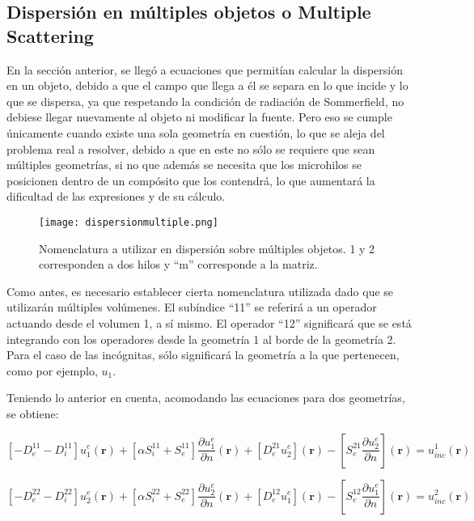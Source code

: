 \documentclass[12pt,letterpaper]{article}
\numberwithin{equation}{section}
\begin{document}
\subsection{Dispersión en múltiples objetos o Multiple Scattering}


En la sección anterior, se llegó a ecuaciones que permitían calcular la dispersión en un objeto, debido a que el campo que llega a él se separa en lo que incide y lo que se dispersa, ya que respetando la condición de radiación de Sommerfield, no debiese llegar nuevamente al objeto ni modificar la fuente. Pero eso se cumple únicamente cuando existe una sola geometría en cuestión, lo que se aleja del problema real a resolver, debido a que en este no sólo se requiere que sean múltiples geometrías, si no que además se necesita que los microhilos se posicionen dentro de un compósito que los contendrá, lo que aumentará la dificultad de las expresiones y de su cálculo.

\begin{figure}[H]
	\centering\texttt{[image: dispersionmultiple.png]}
	\caption{Nomenclatura a utilizar en dispersión sobre múltiples objetos. 1 y 2 corresponden a dos hilos y ``m'' corresponde a la matriz.}
	\label{fig: dispersionmultiple}
\end{figure} 

Como antes, es necesario establecer cierta nomenclatura utilizada dado que se utilizarán múltiples volúmenes. El subíndice ``11'' se referirá a un operador actuando desde el volumen 1, a sí mismo. El operador ``12'' significará que se está integrando con los operadores desde la geometría 1 al borde de la geometría 2. Para el caso de las incógnitas, sólo significará la geometría a la que pertenecen, como por ejemplo, $u_{1}$. 

Teniendo lo anterior en cuenta, acomodando las ecuaciones para dos geometrías, se obtiene:

\begin{equation}
\left[-D_{e}^{11} - D_{i}^{11}\right] u^{e}_1(\textbf{r}) + \left[\alpha S_{i}^{11} + S_{e}^{11}\right]\frac{\partial u^{e}_1}{\partial n}(\textbf{r}) + \left[D_{e}^{21} u^{e}_2\right](\textbf{r}) - \left[S_{e}^{21} \frac{\partial u^{e}_2}{\partial n}\right](\textbf{r}) = u_{inc}^1(\textbf{r}) 
\label{eq: multi_trans_1}		
\end{equation}

\begin{equation}
\left[-D_{e}^{22} - D_{i}^{22}\right] u^{e}_2(\textbf{r}) + \left[\alpha S_{i}^{22} + S_{e}^{22}\right]\frac{\partial u^{e}_2}{\partial n}(\textbf{r}) + \left[D_{e}^{12} u^{e}_1\right](\textbf{r}) - \left[S_{e}^{12} \frac{\partial u^{e}_1}{\partial n}\right](\textbf{r}) = u_{inc}^2(\textbf{r}) 
\label{eq: multi_trans_2}		
\end{equation}
\end{document}
